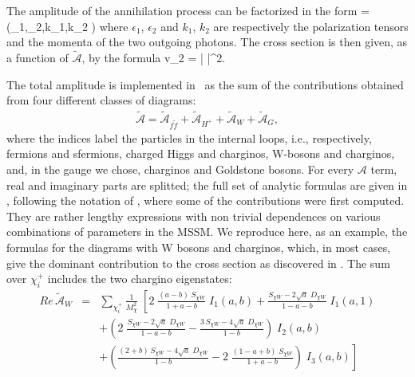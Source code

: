 The amplitude of the annihilation process can be factorized in the
form
\beq
{} =
  \epsilon\left(\epsilon_{1},\epsilon_{2},k_{1},k_{2} \right)
  \;
\eeq
where $\epsilon_{1}$, $\epsilon_{2}$ and $k_{1}$, $k_{2}$ are
respectively the polarization tensors and the momenta of the two outgoing 
photons. The cross section is then given, as a function of
$\tilde{\mathcal{A}}$, by the formula
\beq
  v\sigma_{2\gamma} =  \left|\;
\; \right|^{2}\;\;\;.  \label{eq:sigmav2g}
\eeq

The total amplitude is implemented in \ds\ as the sum of the contributions 
obtained from four different classes of diagrams:
\begin{eqnarray*}
\tilde{\mathcal{A}}=\tilde{\mathcal{A}}_{f\tilde{f}}+
  \tilde{\mathcal{A}}_{H^+}+\tilde{\mathcal{A}}_{W}+\tilde{\mathcal{A}}_{G},
\end{eqnarray*}
where the indices label the particles in the internal loops, i.e.,
respectively, fermions and sfermions, charged Higgs and charginos, 
W-bosons and charginos, and, in the gauge we chose, charginos and Goldstone 
bosons. For every $\mathcal{A}$ term, real
and imaginary parts are splitted; the full set of analytic formulas are 
given in \cite{lp}, following the notation of \cite{linejk}, where some of 
the contributions were first computed. They are rather lengthy expressions
with non trivial dependences on various combinations of parameters in 
the MSSM. We reproduce here, as an example, the formulas for the diagrams
with W bosons and charginos, which, in  most cases, give the dominant 
contribution to the cross section as discovered in \cite{lp}. The sum over
$\chi^+_i$ includes the two chargino eigenstates:
\begin{eqnarray}
Re\,\tilde{\mathcal{A}}_{W} & = &
\sum_{\chi^+_i} \frac{1}{M^2_{\chi}} \; \left[ 2\;
\frac{\left(a-b\right)\;
  S_{\chi W}}{1+a-b} \;I_{1} \left( a,b \right)+\frac{S_{\chi W}-2
\sqrt{a}\;
  D_{\chi W}}{1-a-b} \;I_{1} \left( a,1 \right) \right. \nonumber \\
   &&\left. + \left( 2\;\frac{S_{\chi W}-2 \sqrt{a}\;D_{\chi
W}}{1-a-b}-
    \frac{3\,S_{\chi W}-4 \sqrt{a}\;D_{\chi W}}{1-b}  \right)\;I_{2}
    \left( a,b \right) \right. \nonumber \\
   && \left.+ \left( \frac{\left(2+b\right)\,S_{\chi W}-4 \sqrt{a}\;
    D_{\chi W}}{1-b} -2\;\frac{\left( 1-a+b \right)\; S_{\chi
W}}{1+a-b}
    \right)\;I_{3}\left( a,b \right) \right]
\end{eqnarray}

